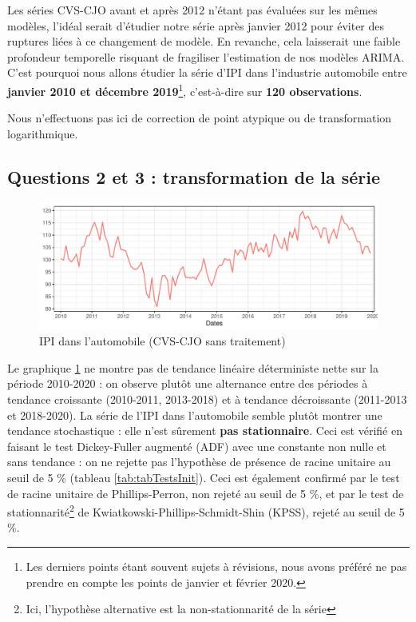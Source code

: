 \documentclass[]{article}
\let\rmarkdownfootnote\footnote%
\def\footnote{\protect\rmarkdownfootnote}
\begin{document}
Les séries CVS-CJO avant et après 2012 n'étant pas évaluées sur les mêmes modèles, l'idéal serait d'étudier notre série après janvier 2012 pour éviter des ruptures liées à ce changement de modèle. En revanche, cela laisserait une faible profondeur temporelle risquant de fragiliser l'estimation de nos modèles ARIMA.
C'est pourquoi nous allons étudier la série d'IPI dans l'industrie automobile entre \textbf{janvier 2010 et décembre 2019}\footnote{Les derniers points étant souvent sujets à révisions, nous avons préféré ne pas prendre en compte les points de janvier et février 2020.}, c'est-à-dire sur \textbf{120 observations}.

Nous n'effectuons pas ici de correction de point atypique ou de transformation logarithmique.

\hypertarget{questions-2-et-3-transformation-de-la-suxe9rie}{%
\subsection{Questions 2 et 3 : transformation de la série}\label{questions-2-et-3-transformation-de-la-suxe9rie}}

\begin{figure}

{\centering \includegraphics{img/rmd-ipiBrut-1} 

}

\caption{IPI dans l'automobile (CVS-CJO sans traitement)}\label{fig:ipiBrut}
\end{figure}

Le graphique \ref{fig:ipiBrut} ne montre pas de tendance linéaire déterministe nette sur la période 2010-2020 : on observe plutôt une alternance entre des périodes à tendance croissante (2010-2011, 2013-2018) et à tendance décroissante (2011-2013 et 2018-2020).
La série de l'IPI dans l'automobile semble plutôt montrer une tendance stochastique : elle n'est sûrement \textbf{pas stationnaire}. Ceci est vérifié en faisant le test Dickey-Fuller augmenté (ADF) avec une constante non nulle et sans tendance : on ne rejette pas l'hypothèse de présence de racine unitaire au seuil de 5 \% (tableau \ref{tab:tabTestsInit}).
Ceci est également confirmé par le test de racine unitaire de Phillips-Perron, non rejeté au seuil de 5 \%, et par le test de stationnarité\footnote{Ici, l'hypothèse alternative est la non-stationnarité de la série} de Kwiatkowski-Phillips-Schmidt-Shin (KPSS), rejeté au seuil de 5 \%.
\end{document}
